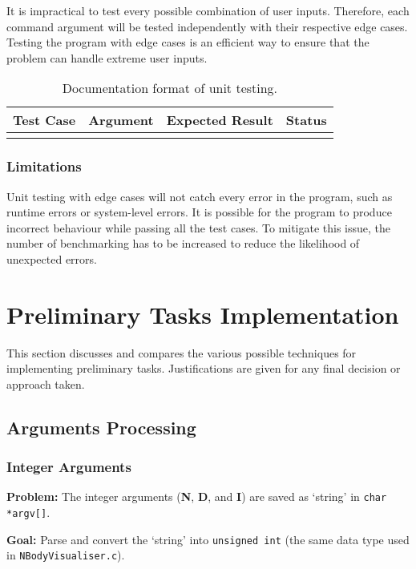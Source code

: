 \documentclass[12pt, a4paper]{article}
\begin{document}
It is impractical to test every possible combination of user inputs. Therefore, each command
argument will be tested independently with their respective edge cases. Testing the program with
edge cases is an efficient way to ensure that the problem can handle extreme user inputs.

\begin{table}[H]
  \centering
  \begin{tabular}{|c|c|c|c|}
    \hline \rowcolor[HTML]{D8D8D8}
    Test Case & Argument & Expected Result & Status \\ \hline
    & & & \\ \hline
    \end{tabular}
  \caption{Documentation format of unit testing.}
\end{table}

\subsubsection{Limitations}
Unit testing with edge cases will not catch every error in the program, such as runtime errors or
system-level errors. It is possible for the program to produce incorrect behaviour while passing all
the test cases. To mitigate this issue, the number of benchmarking has to be increased to reduce the
likelihood of unexpected errors.

\section{Preliminary Tasks Implementation}
This section discusses and compares the various possible techniques for implementing preliminary
tasks. Justifications are given for any final decision or approach taken.

\subsection{Arguments Processing}
\subsubsection{Integer Arguments} \label{subsec:args}
\begin{tcolorbox}
\textbf{Problem:} The integer arguments (\textbf{N}, \textbf{D}, and \textbf{I}) are saved as
`string' in \texttt{char *argv[]}.

\bigskip\textbf{Goal:} Parse and convert the `string' into \texttt{unsigned int} (the same
data type used in \texttt{NBodyVisualiser.c}).
\end{tcolorbox}
\end{document}
